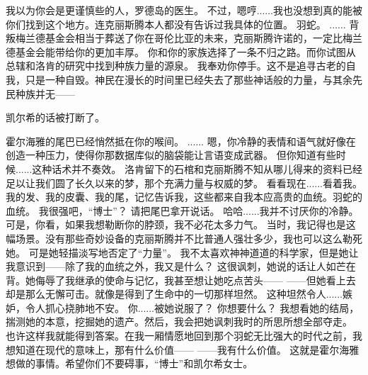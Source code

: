 \documentclass[openany]{book}
\begin{document}
\begin{dialogue}
     我以为你会是更谨慎些的人，罗德岛的医生。
     不过，嗯哼......我也没想到真的能被你们找到这个地方。连克丽斯腾本人都没有告诉过我具体的位置。
     羽蛇。
     ......
     背叛梅兰德基金会相当于葬送了你在哥伦比亚的未来，克丽斯腾许诺的，一定比梅兰德基金会能带给你的更加丰厚。
     你和你的家族选择了一条不归之路。而你试图从总辖和洛肯的研究中找到种族力量的源泉。
     我奉劝你停手。这不是追寻古老的自我，只是一种自毁。神民在漫长的时间里已经失去了那些神话般的力量，与其余先民种族并无——\par
    凯尔希的话被打断了。\par
    霍尔海雅的尾巴已经悄然抵在你的喉间。
     ......
     嗯，你冷静的表情和语气就好像在创造一种压力，使得你那数据库似的脑袋能让言语变成武器。
     但你知道有些时候......这种话术并不奏效。
     洛肯留下的石棺和克丽斯腾不知从哪儿得来的资料已经足以让我们圆了长久以来的梦，那个充满力量与权威的梦。
     看看现在......看着我。我的发、我的皮囊、我的尾，记忆告诉我，这些都来自我本应高贵的血统。羽蛇的血统。
     我很强吧，“博士”？
     请把尾巴拿开说话。
     哈哈......我并不讨厌你的冷静。可是，你看，如果我想勒断你的脖颈，我不必花太多力气。
     当时，我记得也是这幅场景。没有那些奇妙设备的克丽斯腾并不比普通人强壮多少，我也可以这么勒死她。
     可是她轻描淡写地否定了“力量”。
     我不太喜欢神神道道的科学家，但是她让我意识到——除了我的血统之外，我又是什么？
     这很讽刺，她说的话让人如芒在背。她侮辱了我继承的使命与记忆，我甚至想让她吃点苦头——
     ——但她看上去却是那么无懈可击。就像是得到了生命中的一切那样坦然。
     这种坦然令人......嫉妒，令人抓心挠肺地不安。
     你......被她说服了？
     你想要什么？
     我想看她的结局，揣测她的本意，挖掘她的遗产。然后，我会把她讽刺我时的所思所想全部夺走。
     也许这样我就能得到答案。在我一厢情愿地回到那个羽蛇无比强大的时代之前，我想知道在现代的意味上，那有什么价值——
     ——我有什么价值。
     这就是霍尔海雅想做的事情。希望你们不要碍事，“博士”和凯尔希女士。
\end{dialogue}
\end{document}
